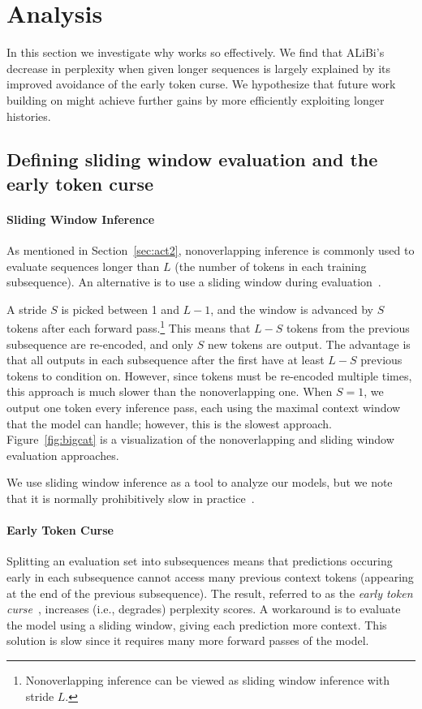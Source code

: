 \section{Analysis}
\label{sec:analysis}




In this section we investigate why \al works so effectively.  
We find that ALiBi's decrease in perplexity when given longer sequences is largely explained by its improved avoidance of the early token curse.  We hypothesize that future work building on \al might achieve further gains by more efficiently  exploiting longer histories.


\subsection{Defining sliding window evaluation and the early token curse}




\paragraph{Sliding Window Inference}
As mentioned in Section~\ref{sec:act2}, nonoverlapping inference is commonly used to evaluate sequences longer than $L$ (the number of tokens in each training subsequence). 
An alternative is to use a sliding window during evaluation~\citep{baevski}. 

A stride $S$ is picked between 1 and $L-1$, and the window is advanced by $S$ tokens after each forward pass.\footnote{Nonoverlapping inference can be viewed as sliding window inference with stride $L$.} This means that $L-S$ tokens from the previous subsequence are re-encoded, and only $S$ new tokens are output. The advantage is that all outputs in each subsequence after the first have at least $L-S$ previous tokens to condition on. However, since tokens must be re-encoded multiple times, this approach is much slower than the nonoverlapping one. 
When $S=1$, we output one token every inference pass, each using the maximal context window that the model can handle; however, this is the slowest approach. 
Figure~\ref{fig:bigcat} is a visualization of the nonoverlapping and sliding window evaluation approaches. 

We use sliding window inference as a tool to analyze our models, but we note that it is normally prohibitively slow in practice~\citep{shortformer}. 

\paragraph{Early Token Curse}
Splitting an evaluation set into subsequences means that predictions occuring early in each subsequence cannot access many previous context tokens (appearing at the end of the previous subsequence). 
The result, referred to as the \emph{early token curse}~\citep{shortformer}, increases (i.e., degrades) perplexity scores. %
A workaround is to evaluate the model using a sliding window, giving each prediction more context. This solution is slow since it requires many more forward passes of the model. 


